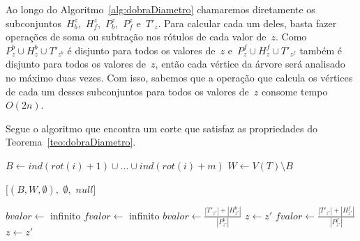 		Ao longo do Algoritmo~\ref{alg:dobraDiametro} chamaremos diretamente
		os subconjuntos~$H_b^z$,~$H_f^z$,~$P_b^z$,~$P_f^z$ e~$T'_z$.
		Para calcular cada um deles, basta fazer operações de soma ou subtração
		nos rótulos de cada valor de~$z$.
		Como~${P^b_z\cup H^b_z\cup T'_{z^b}}$ é disjunto para todos os 
		valores de~$z$ e~${P^f_z\cup H^f_z\cup T'_{z^f}}$ também é disjunto
		para todos os valores de~$z$,
		então cada vértice da árvore será analisado no máximo duas vezes.
		Com isso, sabemos que a operação que calcula os vértices de cada um desses 
		subconjuntos para todos os valores de~$z$ consome tempo~$O(2n)$.


		Segue o algoritmo que encontra um corte que satisfaz as propriedades do
		Teorema~\ref{teo:dobraDiametro}.

		\bigskip

	\begin{algorithm}[H]
	\label{alg:dobraDiametro}

		\caption{}
		{
			{
				$B\gets ind(rot(i)+1)\cup\ldots\cup ind(rot(i)+m)$\;
				$W\gets V(T)\setminus B$\;

				\Return $[(B,W,\emptyset),$ $\emptyset,$ $null]$\;
			}
		}
		$bvalor \gets$ infinito \;
		$fvalor \gets$ infinito\;
		{
			{
			 	$bvalor \gets \frac{|T'_{z'}|+|H_{z'}^b|}{|P^b_{z'}|}$\;
			 	$z \gets z'$\; 
			}
		}
		{
			{
			 	$fvalor \gets \frac{|T'_{z'}|+|H_{z'}^f|}{|P^f_{z'}|}$\;
			 	$z \gets z'$\; 
			}
		}
	\end{algorithm}	

